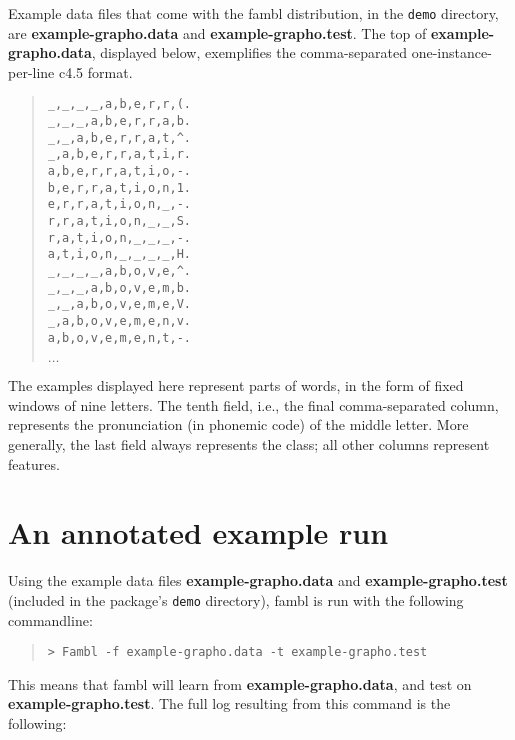 \documentclass[11pt]{article}
\begin{document}
Example data files that come with the {\sc fambl} distribution, in the
{\tt demo} directory, are {\bf example-grapho.data} and {\bf
  example-grapho.test}. The top of {\bf example-grapho.data},
displayed below, exemplifies the comma-separated one-instance-per-line
{\sc c4.5} format.

\begin{quote}
{\tiny
\begin{verbatim}
_,_,_,_,a,b,e,r,r,(.
_,_,_,a,b,e,r,r,a,b.
_,_,a,b,e,r,r,a,t,^.
_,a,b,e,r,r,a,t,i,r.
a,b,e,r,r,a,t,i,o,-.
b,e,r,r,a,t,i,o,n,1.
e,r,r,a,t,i,o,n,_,-.
r,r,a,t,i,o,n,_,_,S.
r,a,t,i,o,n,_,_,_,-.
a,t,i,o,n,_,_,_,_,H.
_,_,_,_,a,b,o,v,e,^.
_,_,_,a,b,o,v,e,m,b.
_,_,a,b,o,v,e,m,e,V.
_,a,b,o,v,e,m,e,n,v.
a,b,o,v,e,m,e,n,t,-.
\end{verbatim}
$\ldots$
}
\end{quote}

The examples displayed here represent parts of words, in the form of
fixed windows of nine letters. The tenth field, i.e., the final
comma-separated column, represents the pronunciation (in phonemic
code) of the middle letter. More generally, the last field always
represents the class; all other columns represent features.

\section{An annotated example run}
\label{examples}

Using the example data files {\bf example-grapho.data} and {\bf
  example-grapho.test} (included in the package's {\tt demo}
directory), {\sc fambl} is run with the following commandline:

\begin{quote}
{\footnotesize
\begin{verbatim}
> Fambl -f example-grapho.data -t example-grapho.test
\end{verbatim}
}
\end{quote}

This means that {\sc fambl} will learn from {\bf example-grapho.data},
and test on {\bf example-grapho.test}.  The full log resulting from
this command is the following:
\end{document}

